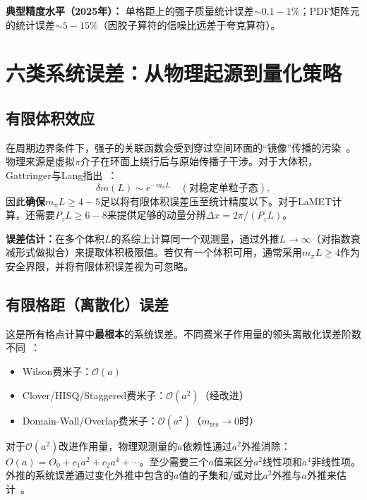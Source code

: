 \documentclass[12pt,a4paper]{ctexart}
\begin{document}
\textbf{典型精度水平（2025年）：} 单格距上的强子质量统计误差$\sim 0.1-1\%$；PDF矩阵元的统计误差$\sim 5-15\%$（因胶子算符的信噪比远差于夸克算符）。

\section{六类系统误差：从物理起源到量化策略}

\subsection{有限体积效应}

在周期边界条件下，强子的关联函数会受到穿过空间环面的``镜像''传播的污染~\cite{GattringerLang2010}。物理来源是虚拟$\pi$介子在环面上绕行后与原始传播子干涉。对于大体积，Gattringer与Lang指出~\cite{GattringerLang2010}：
\begin{equation}
\delta m(L) \sim e^{-m_\pi L} \quad (\text{对稳定单粒子态}),
\label{eq:finite_volume_exp}
\end{equation}
因此\textbf{确保$m_\pi L \ge 4-5$}足以将有限体积误差压至统计精度以下。对于LaMET计算，还需要$P_z L \ge 6-8$来提供足够的动量分辨$\Delta x = 2\pi/(P_z L)$。

\textbf{误差估计：}在多个体积$L$的系综上计算同一个观测量，通过外推$L\to\infty$（对指数衰减形式做拟合）来提取体积极限值。若仅有一个体积可用，通常采用$m_\pi L \ge 4$作为安全界限，并将有限体积误差视为可忽略。

\subsection{有限格距（离散化）误差}

这是所有格点计算中\textbf{最根本}的系统误差。不同费米子作用量的领头离散化误差阶数不同~\cite{GattringerLang2010}：
\begin{itemize}[nosep]
    \item Wilson费米子：$\mathcal{O}(a)$
    \item Clover/HISQ/Staggered费米子：$\mathcal{O}(a^2)$（经改进）
    \item Domain-Wall/Overlap费米子：$\mathcal{O}(a^2)$（$m_{\text{res}}\to 0$时）
\end{itemize}

对于$\mathcal{O}(a^2)$改进作用量，物理观测量的$a$依赖性通过$a^2$外推消除：$O(a) = O_0 + c_1 a^2 + c_2 a^4 + \cdots$。至少需要三个$a$值来区分$a^2$线性项和$a^4$非线性项。外推的系统误差通过变化外推中包含的$a$值的子集和/或对比$a^2$外推与$a$外推来估计~\cite{GattringerLang2010}。
\end{document}
